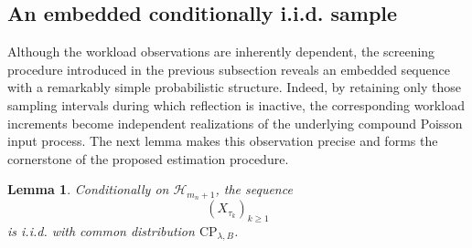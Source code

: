 \documentclass[12pt]{article}
\newcommand{\1}{\mathbf{1}}
\newtheorem{lemma}{Lemma}
\begin{document}
\subsection{An embedded conditionally i.i.d. sample}
Although the workload observations are inherently dependent, the screening procedure introduced in the previous subsection reveals an embedded sequence with a remarkably simple probabilistic structure. Indeed, by retaining only those sampling intervals during which reflection is inactive, the corresponding workload increments become independent realizations of the underlying compound Poisson input process. The next lemma makes this observation precise and forms the cornerstone of the proposed estimation procedure.
\begin{lemma}\label{lemma: embedded iid}
Conditionally on $\mathcal H_{m_n+1}$, the sequence
\[
(X_{\tau_k})_{k\ge1}
\]
is i.i.d. with common distribution $\mathrm{CP}_{\lambda,B}$.
\end{lemma}
\end{document}
